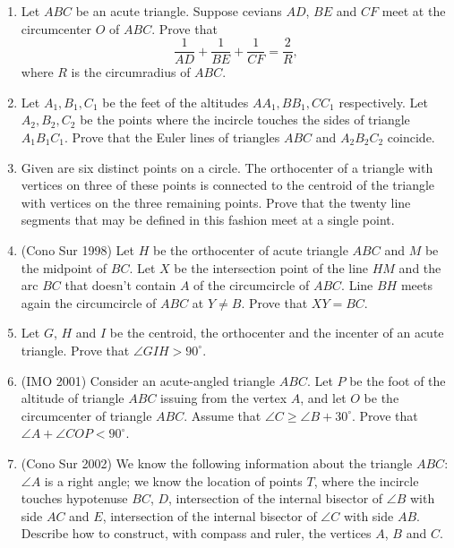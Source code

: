 \documentclass[10pt]{article}
\theoremstyle{definition}
\theoremstyle{remark}
\begin{document}
\begin{enumerate}
\item Let $ABC$ be an acute triangle. Suppose cevians $AD$, $BE$ and $CF$ meet at the circumcenter $O$ of $ABC$. Prove that
$$\frac1{AD} + \frac1{BE} + \frac1{CF} = \frac2R,$$
where $R$ is the circumradius of $ABC$.

\item Let $A_1,B_1,C_1$ be the feet of the altitudes $AA_1,BB_1,CC_1$ respectively. Let $A_2,B_2,C_2$ be the points where the incircle touches the sides of triangle $A_1B_1C_1$. Prove that the Euler lines of triangles $ABC$ and $A_2B_2C_2$ coincide.

\item Given are six distinct points on a circle. The orthocenter of a triangle with vertices on three of these points is connected to the centroid of the triangle with vertices on the three remaining points. Prove that the twenty line segments that may be defined in this fashion meet at a single point.

\item (Cono Sur 1998) Let $H$ be the orthocenter of acute triangle $ABC$ and $M$ be the midpoint of $BC$. Let $X$ be the intersection point of the line $HM$ and the arc $BC$ that doesn't contain $A$ of the circumcircle of $ABC$. Line $BH$ meets again the circumcircle of $ABC$ at $Y\neq B$. Prove that $XY = BC$.

\item Let $G$, $H$ and $I$ be the centroid, the orthocenter and the incenter of an acute triangle. Prove that $\angle GIH > 90^\circ$.

\item (IMO 2001) Consider an acute-angled triangle $ABC$. Let $P$ be the foot of the altitude of triangle $ABC$ issuing from the vertex $A$, and let $O$ be the circumcenter of triangle $ABC$. Assume that $\angle C \geq \angle B+30^{\circ}$. Prove that $\angle A+\angle COP < 90^{\circ}$.

\item (Cono Sur 2002) We know the following information about the triangle $ABC$: $\angle A$ is a right angle; we know the location of points $T$, where the incircle touches hypotenuse $BC$, $D$, intersection of the internal bisector of $\angle B$ with side $AC$ and $E$, intersection of the internal bisector of $\angle C$ with side $AB$. Describe how to construct, with compass and ruler, the vertices $A$, $B$ and $C$.


\end{enumerate}
\end{document}
